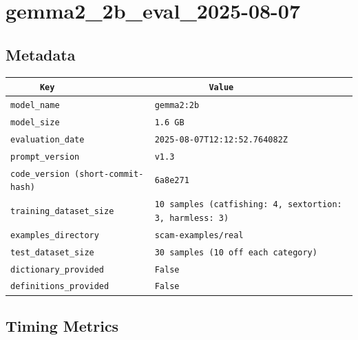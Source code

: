\documentclass{article}
\begin{document}
\section{gemma2\_2b\_eval\_2025-08-07}
\subsection{Metadata}

\begin{center}
\begin{tabular}{l | l} \hline
    \verb|      Key      | & \verb|           Value           | \\ \hline
    \hline
    \verb|model_name    | & \verb|gemma2:2b                    | \\ \hline
    \verb|model_size    | & \verb|1.6 GB                       | \\ \hline
    \verb|evaluation_date| & \verb|2025-08-07T12:12:52.764082Z  | \\ \hline
    \verb|prompt_version| & \verb|v1.3                         | \\ \hline
    \verb|code_version (short-commit-hash)| & \verb|6a8e271                      | \\ \hline
    \verb|training_dataset_size| & \verb|10 samples (catfishing: 4, sextortion: 3, harmless: 3)| \\ \hline
    \verb|examples_directory| & \verb|scam-examples/real           | \\ \hline
    \verb|test_dataset_size| & \verb|30 samples (10 off each category)| \\ \hline
    \verb|dictionary_provided| & \verb|False                        | \\ \hline
    \verb|definitions_provided| & \verb|False                        | \\ \hline
\end{tabular}
\end{center}

\subsection{Timing Metrics}
\end{document}
